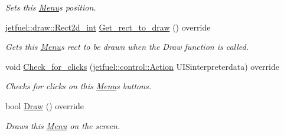 \begin{DoxyCompactItemize}
\begin{DoxyCompactList}\small\item\em Sets this \hyperlink{classjetfuel_1_1gui_1_1Menu}{Menu}\textquotesingle{}s position. \end{DoxyCompactList}\item 
\hyperlink{classjetfuel_1_1draw_1_1Rect2d}{jetfuel\+::draw\+::\+Rect2d\+\_\+int} \hyperlink{classjetfuel_1_1gui_1_1Menu_a1d5c050dcad48008898eafe2d610eff6}{Get\+\_\+rect\+\_\+to\+\_\+draw} () override
\begin{DoxyCompactList}\small\item\em Gets this \hyperlink{classjetfuel_1_1gui_1_1Menu}{Menu}\textquotesingle{}s rect to be drawn when the Draw function is called. \end{DoxyCompactList}\item 
void \hyperlink{classjetfuel_1_1gui_1_1Menu_a17298e1cec290db84ab4e3b1b13bd614}{Check\+\_\+for\+\_\+clicks} (\hyperlink{structjetfuel_1_1control_1_1Action}{jetfuel\+::control\+::\+Action} U\+I\+Sinterpreterdata) override
\begin{DoxyCompactList}\small\item\em Checks for clicks on this \hyperlink{classjetfuel_1_1gui_1_1Menu}{Menu}\textquotesingle{}s buttons. \end{DoxyCompactList}\item 
bool \hyperlink{classjetfuel_1_1gui_1_1Menu_a0355f5ee3060b1ae9d85a5c8cba3795b}{Draw} () override
\begin{DoxyCompactList}\small\item\em Draws this \hyperlink{classjetfuel_1_1gui_1_1Menu}{Menu} on the screen. \end{DoxyCompactList}\end{DoxyCompactItemize}
